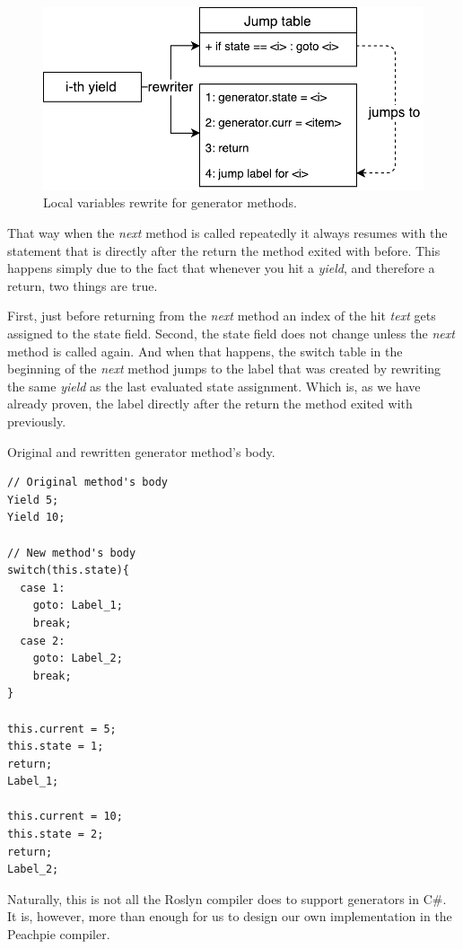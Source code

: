 \begin{figure}[h]
	\centering	
	\includegraphics[scale=0.75]{../img/4_1_position}	
	\caption{Local variables rewrite for generator methods.}
	\label{fig4.1:Position}
\end{figure}

That way when the \emph{next} method is called repeatedly it always resumes with the statement that is directly after the return the method exited with before. This happens simply due to the fact that whenever you hit a \emph{yield}, and therefore a return, two things are true. 

First, just before returning from the \emph{next} method an index of the hit \emph{text} gets assigned to the state field. Second, the state field does not change unless the \emph{next} method is called again. And when that happens, the switch table in the beginning of the \emph{next} method jumps to the label that was created by rewriting the same \emph{yield} as the last evaluated state assignment. Which is, as we have already proven, the label directly after the return the method exited with previously.

\begin{listing}[H]
\caption{Original and rewritten generator method's body.}
\label{list4.1:generatorRewrite}
\begin{verbatim}
// Original method's body
Yield 5;
Yield 10;

// New method's body
switch(this.state){
  case 1:
    goto: Label_1;
    break;
  case 2:
    goto: Label_2;
    break;
}

this.current = 5;
this.state = 1;
return;
Label_1;

this.current = 10;
this.state = 2;
return;
Label_2;
\end{verbatim}
\end{listing}

Naturally, this is not all the Roslyn compiler does to support generators in C\#. It is, however, more than enough for us to design our own implementation in the Peachpie compiler. 


